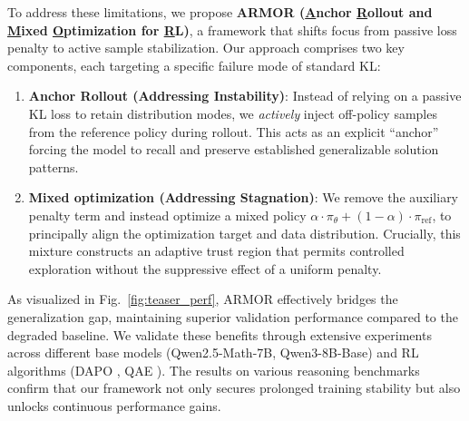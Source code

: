 To address these limitations, we propose \textbf{ARMOR ({\ul A}nchor {\ul R}ollout and {\ul M}ixed {\ul O}ptimization for {\ul R}L)}, a framework that shifts focus from passive loss penalty to active sample stabilization. Our approach comprises two key components, each targeting a specific failure mode of standard KL:
\begin{enumerate}[left=0.5em, topsep=2pt, itemsep=2pt]
\item [(1)] \textbf{Anchor Rollout (Addressing Instability)}: Instead of relying on a passive KL loss to retain distribution modes, we \emph{actively} inject off-policy samples from the reference policy during rollout. 
This acts as an explicit ``anchor'' forcing the model to recall and preserve established generalizable solution patterns.
\item [(2)] \textbf{Mixed optimization (Addressing Stagnation)}: We remove the auxiliary penalty term and instead optimize a mixed policy $\alpha\cdot \pi_\theta + (1-\alpha) \cdot \pi_\mathrm{ref}$, to principally align the optimization target and data distribution.
Crucially, this mixture constructs an adaptive trust region \citep{PPO} that permits controlled exploration without the suppressive effect of a uniform penalty.
\end{enumerate}
As visualized in Fig.~\ref{fig:teaser_perf}, ARMOR effectively bridges the generalization gap, maintaining superior validation performance compared to the degraded baseline.
We validate these benefits through extensive experiments across different base models (\eg Qwen2.5-Math-7B, Qwen3-8B-Base) and RL algorithms (\eg DAPO \citep{DAPO}, QAE \citep{QAE}). 
The results on various reasoning benchmarks confirm that our framework not only secures prolonged training stability but also unlocks continuous performance gains.


